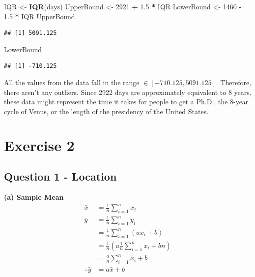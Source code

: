\documentclass[
]{book}
\newenvironment{Shaded}{\begin{snugshade}}{\end{snugshade}}
\newcommand{\DecValTok}[1]{\textcolor[rgb]{0.00,0.00,0.81}{#1}}
\newcommand{\FloatTok}[1]{\textcolor[rgb]{0.00,0.00,0.81}{#1}}
\newcommand{\FunctionTok}[1]{\textcolor[rgb]{0.13,0.29,0.53}{\textbf{#1}}}
\newcommand{\NormalTok}[1]{#1}
\newcommand{\OtherTok}[1]{\textcolor[rgb]{0.56,0.35,0.01}{#1}}
\newcommand{\SpecialCharTok}[1]{\textcolor[rgb]{0.81,0.36,0.00}{\textbf{#1}}}
\begin{document}
\begin{Shaded}
\begin{Highlighting}[]
\NormalTok{IQR }\OtherTok{\textless{}{-}} \FunctionTok{IQR}\NormalTok{(days)}
\NormalTok{UpperBound }\OtherTok{\textless{}{-}} \DecValTok{2921} \SpecialCharTok{+} \FloatTok{1.5} \SpecialCharTok{*}\NormalTok{ IQR}
\NormalTok{LowerBound }\OtherTok{\textless{}{-}} \DecValTok{1460} \SpecialCharTok{{-}} \FloatTok{1.5} \SpecialCharTok{*}\NormalTok{ IQR}
\NormalTok{UpperBound}
\end{Highlighting}
\end{Shaded}

\begin{verbatim}
## [1] 5091.125
\end{verbatim}

\begin{Shaded}
\begin{Highlighting}[]
\NormalTok{LowerBound}
\end{Highlighting}
\end{Shaded}

\begin{verbatim}
## [1] -710.125
\end{verbatim}

All the values from the data fall in the range \(\in [-710.125, 5091.125]\). Therefore, there aren't any outliers. Since 2922 days are approximately equivalent to 8 years, these data might represent the time it takes for people to get a Ph.D., the 8-year cycle of Venus, or the length of the presidency of the United States.

\chapter{Exercise 2}\label{exercise-2}

\section{Question 1 - Location}\label{question-1---location}

\textbf{(a) Sample Mean}
\[\begin{aligned}
\bar{x} &= \frac{1}{n} \sum_{i=1}^{n} x_i \\
\bar{y} & =\frac{1}{n} \sum_{i=1}^{n} y_i \\
         &=\frac{1}{n} \sum_{i=1}^{n} (ax_i + b) \\
         &=\frac{1}{n}(a\frac{1}{n} \sum_{i=1}^{n} x_i + bn) \\
         &=\frac{a}{n} \sum_{i=1}^{n} x_i + b \\
\therefore \bar{y} &= a\bar{x} + b
\end{aligned}\]
\end{document}
